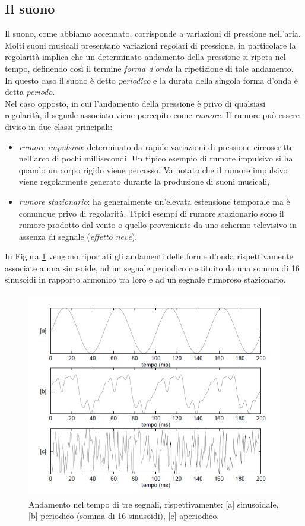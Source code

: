 \documentclass[12pt]{report}
\begin{document}
		\subsection{Il suono}
		\label{cap2sec1_1}
			Il suono, come abbiamo accennato, corrisponde a variazioni di pressione nell'aria. Molti suoni musicali presentano variazioni regolari di pressione, in particolare la regolarità implica che un determinato andamento della pressione si ripeta nel tempo, definendo così il termine {\itshape forma d'onda} la ripetizione di tale andamento. In questo caso il suono è detto {\itshape periodico} e la durata della singola forma d'onda è detta {\itshape periodo}.\\
Nel caso opposto, in cui l'andamento della pressione è privo di qualsiasi regolarità, il segnale associato viene percepito come {\itshape rumore}. Il rumore può essere diviso in due classi principali:
\begin{itemize}
	\item {\itshape rumore impulsivo}: determinato da rapide variazioni di pressione circoscritte nell'arco di pochi millisecondi. Un tipico esempio di rumore impulsivo si ha quando un corpo rigido viene percosso. Va notato che il rumore impulsivo viene regolarmente generato durante la produzione di
suoni musicali,
	\item {\itshape rumore stazionario}: ha generalmente un'elevata estensione temporale ma è comunque privo di regolarità. Tipici esempi di rumore stazionario sono il rumore prodotto dal vento o quello proveniente da uno schermo televisivo in assenza di segnale ({\itshape effetto neve}).
\end{itemize}
In Figura \ref{fig:forma_onda} vengono riportati gli andamenti delle forme d'onda rispettivamente associate a una sinusoide, ad un segnale periodico costituito da una somma di 16 sinusoidi in rapporto armonico tra loro e ad un segnale rumoroso stazionario.

\begin{figure}[htbp]
\centerline{\includegraphics[height=90mm]{img/forma_onda}}
\caption{Andamento nel tempo di tre segnali, rispettivamente: [a] sinusoidale, [b] periodico (somma di 16 sinusoidi), [c] aperiodico.}
\label{fig:forma_onda}
\end{figure}
\end{document}
